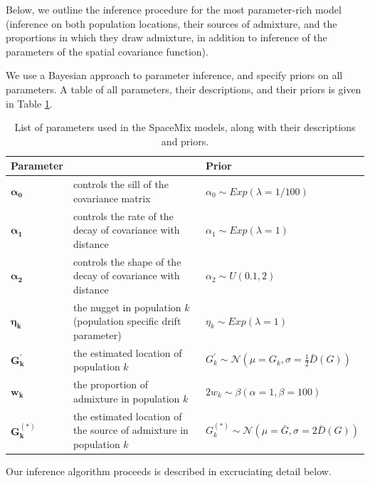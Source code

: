 \documentclass[12pt]{article}
\newcommand{\identifyadmixsource}[1]{{#1^{(*)}}}
\begin{document}
Below, we outline the inference procedure for the most parameter-rich model (inference on both population locations, their sources of admixture, and the proportions in which they draw admixture, in addition to inference of the parameters of the spatial covariance function).

We use a Bayesian approach to parameter inference, and specify priors on all parameters.  A table of all parameters, their descriptions, and their priors is given in Table \ref{tab:param_prior_tab}.

\begin{centering}
\begin{table}
\begin{tabular}{| >{\centering\arraybackslash}m{2.1cm} | m{6cm} | >{\centering\arraybackslash}m{6cm} |}
	\hline
	\textbf{Parameter} & \centering{\textbf{Description}} & \textbf{Prior}\\ \hline
	$\boldsymbol{\alpha_0}$ & 
		controls the sill of the covariance matrix & 
		$\alpha_0 \sim Exp(\lambda = 1/100)$\\ \hline
	$\boldsymbol{\alpha_1}$ & 
		controls the rate of the decay of covariance with distance & 
		$\alpha_1 \sim Exp(\lambda = 1)$\\ \hline
	$\boldsymbol{\alpha_2}$ & 
		controls the shape of the decay of covariance with distance & 
		$\alpha_2 \sim U(0.1,2)$\\ \hline
	$\boldsymbol{\eta_k}$ & 
		the nugget in population $k$ (population specific drift parameter)  & 
		$\eta_k \sim Exp(\lambda = 1)$\\ \hline
	$\boldsymbol{G_k^{\prime}}$ & 
		the estimated location of population $k$ &
		 $G_k^{\prime} \sim \mathcal{N}(\mu = G_k,\sigma = \frac{1}{2}\bar{D}(G))$ \\ \hline
	$\boldsymbol{w_k}$ &
		the proportion of admixture in population $k$ &
		$2 w_k \sim \beta(\alpha = 1,\beta = 100)$  \\ \hline
	$\boldsymbol{\identifyadmixsource{G_k}}$ &
		the estimated location of the source of admixture in population $k$ &
		$\identifyadmixsource{G_k} \sim \mathcal{N}(\mu = \bar{G},\sigma = 2 \bar{D}(G))$ \\
	\hline
\end{tabular}
\caption{List of parameters used in the SpaceMix models, along with their descriptions and priors.}\label{tab:param_prior_tab}
\end{table}
\end{centering}

Our inference algorithm proceeds is described in excruciating detail below.
\end{document}
